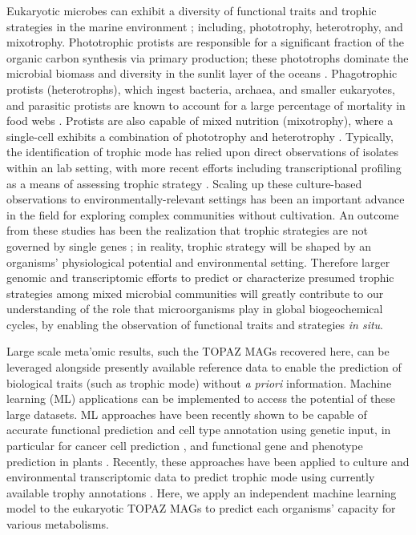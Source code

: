 \documentclass[12pt]{article}
\numberwithin{equation}{section}
\begin{document}
Eukaryotic microbes can exhibit a diversity of functional traits and trophic strategies in the marine environment \citep{Worden2015} \citep{Caron2011Marine}; including, phototrophy, heterotrophy, and mixotrophy. Phototrophic protists are responsible for a significant fraction of the organic carbon synthesis via primary production; these phototrophs dominate the microbial biomass and diversity in the sunlit layer of the oceans \citep{Worden2015,de_Vargas_2015}. Phagotrophic protists (heterotrophs), which ingest bacteria, archaea, and smaller eukaryotes, and parasitic protists are known to account for a large percentage of mortality in food webs \citep{Sherr_2002, Caron2011Marine, Worden2015}. Protists are also capable of mixed nutrition (mixotrophy), where a single-cell exhibits a combination of phototrophy and heterotrophy \citep{Stoecker_2017}. Typically, the identification of trophic mode has relied upon direct observations of isolates within an lab setting, with more recent efforts including transcriptional profiling as a means of assessing trophic strategy \citep{Keeling2014, Liu_2016}. Scaling up these culture-based observations to environmentally-relevant settings \citep{Alexander2015a, hu2018,Gong_2016} has been an important advance in the field for exploring complex communities without cultivation. An outcome from these studies has been the realization that trophic strategies are not governed by single genes \citep{Labarre_2020}; in reality, trophic strategy will be shaped by an organisms' physiological potential and environmental setting. Therefore larger genomic and transcriptomic efforts to predict or characterize presumed trophic strategies among mixed microbial communities will greatly contribute to our understanding of the role that microorganisms play in global biogeochemical cycles, by enabling the observation of functional traits and strategies \textit{in situ}. 

Large scale meta'omic results, such the TOPAZ MAGs recovered here, can be leveraged alongside presently available reference data to enable the prediction of biological traits (such as trophic mode) without \textit{a priori} information. Machine learning (ML) applications can be implemented to access the potential of these large datasets. ML approaches have been recently shown to be capable of accurate functional prediction and cell type annotation using genetic input, in particular for cancer cell prediction \citep{shipp2002diffuse,bashiri2017improving,tabl2019machine}, and functional gene and phenotype prediction in plants \citep{mahood2020machine}. Recently, these approaches have been applied to culture and environmental transcriptomic data to predict trophic mode using currently available trophy annotations \citep{lambert2021dynamic, burns2018gene,Jimenez_2021}. Here, we apply an independent machine learning model to the eukaryotic TOPAZ MAGs to predict each organisms' capacity for various metabolisms.
\end{document}

